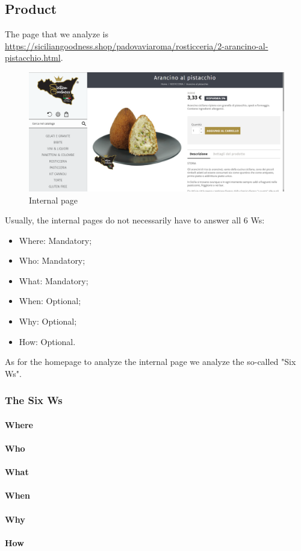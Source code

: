 \pagebreak

\subsection{Product}
The page that we analyze is \url{https://siciliangoodness.shop/padovaviaroma/rosticceria/2-arancino-al-pistacchio.html}.

\begin{figure}[H]
	\centering\includegraphics[width=12cm]{Img/internal.png}
	\caption{Internal page}
\end{figure}

Usually, the internal pages do not necessarily have to answer all 6 Ws:
\begin{itemize}
	\item Where: Mandatory;
	\item Who: Mandatory;
	\item What: Mandatory;
	\item When: Optional;
	\item Why: Optional;
	\item How: Optional.
\end{itemize}
As for the homepage to analyze the internal page we analyze the so-called "Six Ws".

\subsubsection{The Six Ws}

\paragraph{Where}

\paragraph{Who}

\paragraph{What}

\paragraph{When}

\paragraph{Why}

\paragraph{How}

\pagebreak